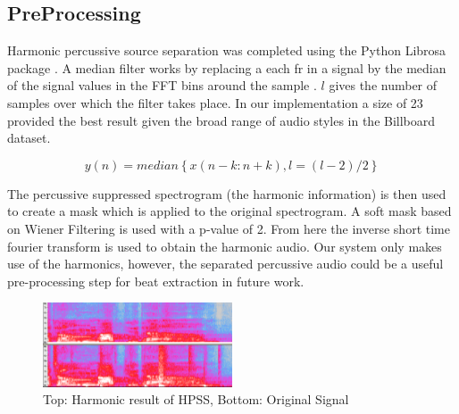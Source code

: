 \documentclass{article}
\begin{document}
\subsection{PreProcessing}

Harmonic percussive source separation was completed using the Python Librosa
package \cite{librosa:24}. A median filter works by replacing a each fr
in a signal by the median of the signal values in the FFT bins around the
sample \cite{FitzGerald:11}.  $l$ gives the number of samples over which the
filter takes place. In our implementation a size of 23 provided the best result
given the broad range of audio styles in the Billboard dataset.

$$y(n) = median \left \{x(n-k:n+k),l = (l-2)/2  \right \}$$

The percussive suppressed spectrogram (the harmonic information) is then used
to create a mask which is applied to the original spectrogram. A soft mask
based on Wiener Filtering is used with a p-value of 2. From here the inverse
short time fourier transform is used to obtain the harmonic audio. Our system
only makes use of the harmonics, however, the  separated percussive audio could
be a useful pre-processing step for beat extraction in future work.

\begin{figure}
   \centering
    \includegraphics[width=0.5\textwidth]{hpssspec.png}
   \caption{Top: Harmonic result of HPSS, Bottom: Original Signal}
   \label{fig:HPSS}
\end{figure}
\end{document}
